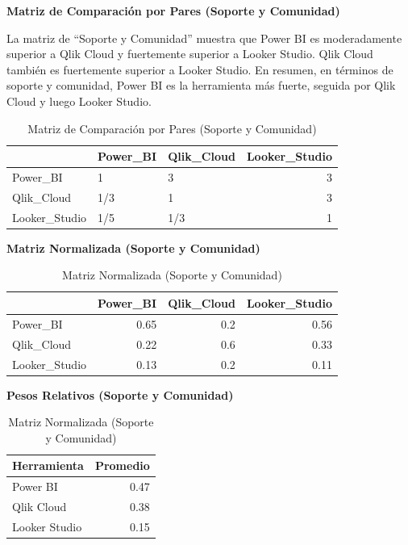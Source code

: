 \documentclass[
  11pt,
  bookmarksnumbered]{article}
\begin{document}
\textbf{Matriz de Comparación por Pares (Soporte y Comunidad)}

La matriz de ``Soporte y Comunidad'' muestra que Power BI es moderadamente superior a Qlik Cloud y fuertemente superior a Looker Studio. Qlik Cloud también es fuertemente superior a Looker Studio. En resumen, en términos de soporte y comunidad, Power BI es la herramienta más fuerte, seguida por Qlik Cloud y luego Looker Studio.

\begin{table}[H]

\caption{\label{tab:unnamed-chunk-48}Matriz de Comparación por Pares (Soporte y Comunidad)}
\centering
\fontsize{12}{14}\selectfont
\begin{tabular}[t]{l|l|l|r}
\hline
  & Power\_BI & Qlik\_Cloud & Looker\_Studio\\
\hline
Power\_BI & 1 & 3 & 3\\
\hline
Qlik\_Cloud & 1/3 & 1 & 3\\
\hline
Looker\_Studio & 1/5 & 1/3 & 1\\
\hline
\end{tabular}
\end{table}

\newpage

\textbf{Matriz Normalizada (Soporte y Comunidad)}

\begin{table}[H]

\caption{\label{tab:unnamed-chunk-49}Matriz Normalizada (Soporte y Comunidad)}
\centering
\fontsize{12}{14}\selectfont
\begin{tabular}[t]{l|r|r|r}
\hline
  & Power\_BI & Qlik\_Cloud & Looker\_Studio\\
\hline
Power\_BI & 0.65 & 0.2 & 0.56\\
\hline
Qlik\_Cloud & 0.22 & 0.6 & 0.33\\
\hline
Looker\_Studio & 0.13 & 0.2 & 0.11\\
\hline
\end{tabular}
\end{table}

\textbf{Pesos Relativos (Soporte y Comunidad)}

\begin{table}[H]

\caption{\label{tab:unnamed-chunk-50}Matriz Normalizada (Soporte y Comunidad)}
\centering
\fontsize{12}{14}\selectfont
\begin{tabular}[t]{l|r}
\hline
Herramienta & Promedio\\
\hline
Power BI & 0.47\\
\hline
Qlik Cloud & 0.38\\
\hline
Looker Studio & 0.15\\
\hline
\end{tabular}
\end{table}
\end{document}
